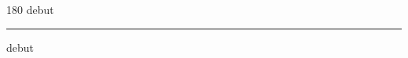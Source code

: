 
\begin{frame}
\begin{center}
\begin{turn}{180}
{\fontsize{2.5cm}{1em}\selectfont debut}
\end{turn}
\vspace{1em}\par  
\hrule
\vspace{1em}\par  
{\fontsize{2.5cm}{1em}\selectfont debut}
\end{center}
\end{frame}
